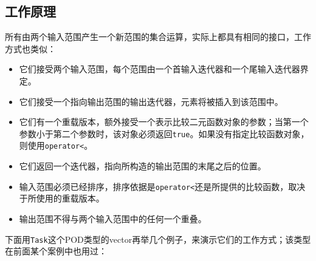 
\subsection{工作原理}



所有由两个输入范围产生一个新范围的集合运算，实际上都具有相同的接口，工作方式也类似：



\begin{itemize}
\item 它们接受两个输入范围，每个范围由一个首输入迭代器和一个尾输入迭代器界定。



\item 它们接受一个指向输出范围的输出迭代器，元素将被插入到该范围中。



\item 它们有一个重载版本，额外接受一个表示比较二元函数对象的参数；当第一个参数小于第二个参数时，该对象必须返回\texttt{true}。如果没有指定比较函数对象，则使用\texttt{operator<}。



\item 它们返回一个迭代器，指向所构造的输出范围的末尾之后的位置。



\item 输入范围必须已经排序，排序依据是\texttt{operator<}还是所提供的比较函数，取决于所使用的重载版本。



\item 输出范围不得与两个输入范围中的任何一个重叠。

\end{itemize}



下面用\texttt{Task}这个POD类型的vector再举几个例子，来演示它们的工作方式；该类型在前面某个案例中也用过：



